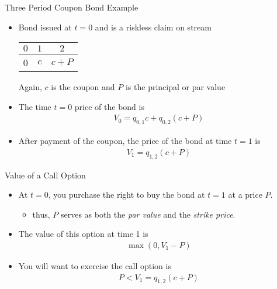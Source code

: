 \documentclass[professionalfonts,small]{beamer}
\begin{document}
\begin{frame}{Three Period Coupon Bond Example}
\footnotesize

\begin{itemize}

\item Bond issued at $t=0$ and is a riskless claim on stream
\begin{center}
\begin{tabular}{ccc}
  $0$    &   $1$   &  $2$   \\
\hline
   0     &   $c$   &   $c+P$  \\
\end{tabular}
\end{center}
Again, $c$ is the coupon and $P$ is the principal or par value

\medskip

\item The time $t=0$ price of the bond is
\begin{eqnarray*}
V_0 = q_{0,1} c + q_{0,2}(c+P)
\end{eqnarray*}

\medskip

\item After payment of the coupon, the price of the bond at time $t=1$ is
\begin{eqnarray*}
V_1 = q_{1,2}(c+P)
\end{eqnarray*}

\end{itemize}

\end{frame}

\begin{frame}{Value of a Call Option}

\footnotesize

\begin{itemize}

\item At $t=0$, you purchase the right to buy the bond at $t=1$ at a price $P$.
\begin{itemize}
\item thus, $P$ serves as both the {\em par value} and the {\em strike price}.
\end{itemize}

\medskip

\item The value of this option at time 1 is
\begin{eqnarray*}
\max(0,V_1 - P)
\end{eqnarray*}

\medskip

\item You will want to exercise the call option is
\begin{eqnarray*}
P <  V_1 = q_{1,2}(c+P)
\end{eqnarray*}

\end{itemize}

\end{frame}
\end{document}
